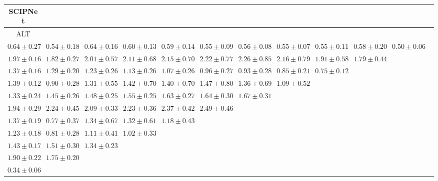 \begin{table}[ht]
{{\begin{adjustbox}{width=\textwidth}
\begin{tabular}{cccccccccccc}
\hline
SCIPNet &  &  &  &  &  &  &  &  &  & \\
\hline
ALT &  &  &  &  &  &  &  &  &  & \\
\hline
$0.64 \pm 0.27$ & $0.54 \pm 0.18$ & $0.64 \pm 0.16$ & $0.60 \pm 0.13$ & $0.59 \pm 0.14$ & $0.55 \pm 0.09$ & $0.56 \pm 0.08$ & $0.55 \pm 0.07$ & $0.55 \pm 0.11$ & $0.58 \pm 0.20$ & $0.50 \pm 0.06$ &  \\
$1.97 \pm 0.16$ & $1.82 \pm 0.27$ & $2.01 \pm 0.57$ & $2.11 \pm 0.68$ & $2.15 \pm 0.70$ & $2.22 \pm 0.77$ & $2.26 \pm 0.85$ & $2.16 \pm 0.79$ & $1.91 \pm 0.58$ & $1.79 \pm 0.44$ &  &  \\
$1.37 \pm 0.16$ & $1.29 \pm 0.20$ & $1.23 \pm 0.26$ & $1.13 \pm 0.26$ & $1.07 \pm 0.26$ & $0.96 \pm 0.27$ & $0.93 \pm 0.28$ & $0.85 \pm 0.21$ & $0.75 \pm 0.12$ &  &  &  \\
$1.39 \pm 0.12$ & $0.90 \pm 0.28$ & $1.31 \pm 0.55$ & $1.42 \pm 0.70$ & $1.40 \pm 0.70$ & $1.47 \pm 0.80$ & $1.36 \pm 0.69$ & $1.09 \pm 0.52$ &  &  &  &  \\
$1.33 \pm 0.24$ & $1.45 \pm 0.26$ & $1.48 \pm 0.25$ & $1.55 \pm 0.25$ & $1.63 \pm 0.27$ & $1.64 \pm 0.30$ & $1.67 \pm 0.31$ &  &  &  &  &  \\
$1.94 \pm 0.29$ & $2.24 \pm 0.45$ & $2.09 \pm 0.33$ & $2.23 \pm 0.36$ & $2.37 \pm 0.42$ & $2.49 \pm 0.46$ &  &  &  &  &  &  \\
$1.37 \pm 0.19$ & $0.77 \pm 0.37$ & $1.34 \pm 0.67$ & $1.32 \pm 0.61$ & $1.18 \pm 0.43$ &  &  &  &  &  &  &  \\
$1.23 \pm 0.18$ & $0.81 \pm 0.28$ & $1.11 \pm 0.41$ & $1.02 \pm 0.33$ &  &  &  &  &  &  &  &  \\
$1.43 \pm 0.17$ & $1.51 \pm 0.30$ & $1.34 \pm 0.23$ &  &  &  &  &  &  &  &  &  \\
$1.90 \pm 0.22$ & $1.75 \pm 0.20$ &  &  &  &  &  &  &  &  &  &  \\
$0.34 \pm 0.06$ &  &  &  &  &  &  &  &  &  &  &  \\

\end{tabular}
\end{adjustbox}
}
}

\end{table}
